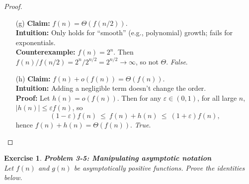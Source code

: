 \documentclass[12pt]{article}
\newtheorem{exercise}[theorem]{Exercise}
\theoremstyle{definition}
\begin{document}
\begin{proof}
\begin{enumerate}
\item[(g)] \textbf{Claim:} $f(n)=\Theta(f(n/2))$.\\
\textbf{Intuition:} Only holds for “smooth” (e.g., polynomial) growth; fails for exponentials.\\
\textbf{Counterexample:} $f(n)=2^{n}$. Then $f(n)/f(n/2)=2^{n}/2^{n/2}=2^{n/2}\to\infty$, so not $\Theta$. \emph{False}.

\item[(h)] \textbf{Claim:} $f(n)+o(f(n))=\Theta(f(n))$.\\
\textbf{Intuition:} Adding a negligible term doesn’t change the order.\\
\textbf{Proof:} Let $h(n)=o(f(n))$. Then for any $\varepsilon\in(0,1)$, for all large $n$, $|h(n)|\le \varepsilon f(n)$, so
\[
(1-\varepsilon)f(n)\ \le\ f(n)+h(n)\ \le\ (1+\varepsilon)f(n),
\]
hence $f(n)+h(n)=\Theta(f(n))$. \emph{True}.
\end{enumerate}
\end{proof}

\newpage

\begin{exercise}
\noindent
\textbf{Problem 3-5: Manipulating asymptotic notation} \\
Let $f(n)$ and $g(n)$ be asymptotically positive functions. Prove the identities below.
\end{exercise}
\end{document}
